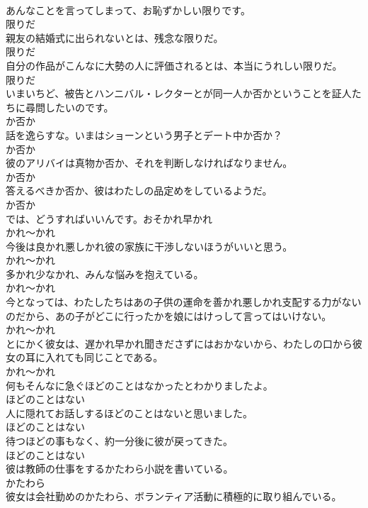 \documentclass[8pt]{extreport}
\begin{document}
\begin{CJK}{UTF8}{min}
\\	あんなことを言ってしまって、お恥ずかしい限りです。	
\\	限りだ	
\\	親友の結婚式に出られないとは、残念な限りだ。	
\\	限りだ	
\\	自分の作品がこんなに大勢の人に評価されるとは、本当にうれしい限りだ。	
\\	限りだ	
\\	いまいちど、被告とハンニバル・レクターとが同一人か否かということを証人たちに尋問したいのです。	
\\	か否か	
\\	話を逸らすな。いまはショーンという男子とデート中か否か？	
\\	か否か	
\\	彼のアリバイは真物か否か、それを判断しなければなりません。	
\\	か否か	
\\	答えるべきか否か、彼はわたしの品定めをしているようだ。	
\\	か否か	
\\	では、どうすればいいんです。おそかれ早かれ
\\	かれ～かれ	
\\	今後は良かれ悪しかれ彼の家族に干渉しないほうがいいと思う。	
\\	かれ～かれ	
\\	多かれ少なかれ、みんな悩みを抱えている。	
\\	かれ～かれ	
\\	今となっては、わたしたちはあの子供の運命を善かれ悪しかれ支配する力がないのだから、あの子がどこに行ったかを娘にはけっして言ってはいけない。	
\\	かれ～かれ	
\\	とにかく彼女は、遅かれ早かれ聞きださずにはおかないから、わたしの口から彼女の耳に入れても同じことである。	
\\	かれ～かれ	
\\	何もそんなに急ぐほどのことはなかったとわかりましたよ。	
\\	ほどのことはない	
\\	人に隠れてお話しするほどのことはないと思いました。	
\\	ほどのことはない	
\\	待つほどの事もなく、約一分後に彼が戻ってきた。	
\\	ほどのことはない	
\\	彼は教師の仕事をするかたわら小説を書いている。	
\\	かたわら	
\\	彼女は会社勤めのかたわら、ボランティア活動に積極的に取り組んでいる。	

\end{CJK}
\end{document}
